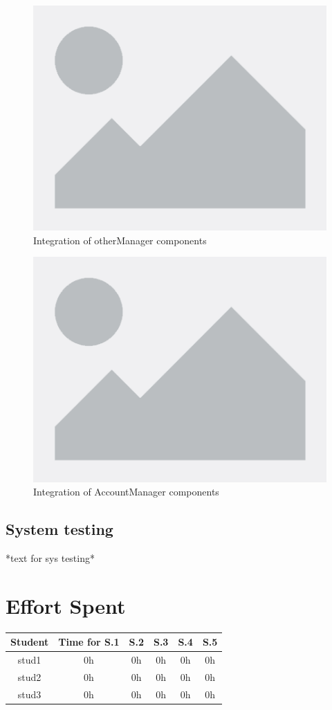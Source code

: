 \documentclass[table, 12pt]{article}
\begin{document}
\begin{figure}[H]
    \centering
    \includegraphics[scale=0.6, center]{assets/placeholder.png}
    \caption{Integration of otherManager components}
    \label{fig: integration_FarmerManager}
\end{figure}
\begin{figure}[H]
    \centering
    \includegraphics[scale=0.7, center]{assets/placeholder.png}
    \caption{Integration of AccountManager components}
    \label{fig: integration_AccountManager}
\end{figure}

\subsection{System testing}
*text for sys testing*
\newpage
\section{Effort Spent}
    \begin{tabular}{|c||c|c|c|c|c|}
        \hline
        Student & Time for S.1 & S.2 & S.3 & S.4 & S.5\\ \hline
        stud1 & 0h & 0h & 0h & 0h & 0h \\
        stud2 & 0h & 0h & 0h & 0h & 0h \\
        stud3 & 0h & 0h & 0h & 0h & 0h \\
        \hline
    \end{tabular}
\end{document}
